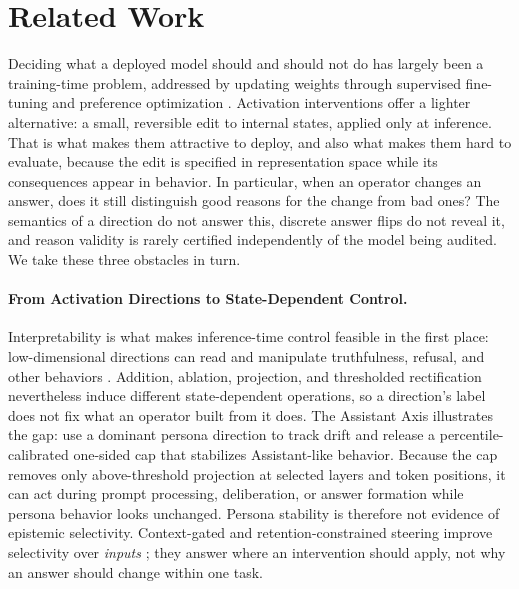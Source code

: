 \documentclass[letterpaper]{article} %
\begin{document}
\section{Related Work}
\label{sec:background}

Deciding what a deployed model should and should not do has largely been a training-time problem, addressed by updating weights through supervised fine-tuning and preference optimization \citep{ouyang2022training,rafailov2023direct}. Activation interventions offer a lighter alternative: a small, reversible edit to internal states, applied only at inference. That is what makes them attractive to deploy, and also what makes them hard to evaluate, because the edit is specified in representation space while its consequences appear in behavior. In particular, when an operator changes an answer, does it still distinguish good reasons for the change from bad ones? The semantics of a direction do not answer this, discrete answer flips do not reveal it, and reason validity is rarely certified independently of the model being audited. We take these three obstacles in turn.

\paragraph{From Activation Directions to State-Dependent Control.}

Interpretability is what makes inference-time control feasible in the first place: low-dimensional directions can read and manipulate truthfulness, refusal, and other behaviors \citep{zou2023representation,turner2023steering,li2023inference,rimsky2024steering,arditi2024refusal}. Addition, ablation, projection, and thresholded rectification nevertheless induce different state-dependent operations, so a direction's label does not fix what an operator built from it does. The Assistant Axis illustrates the gap: \citet{lu2026assistant} use a dominant persona direction to track drift and release a percentile-calibrated one-sided cap that stabilizes Assistant-like behavior. Because the cap removes only above-threshold projection at selected layers and token positions, it can act during prompt processing, deliberation, or answer formation while persona behavior looks unchanged. Persona stability is therefore not evidence of epistemic selectivity. Context-gated and retention-constrained steering improve selectivity over \emph{inputs} \citep{lee2025programming,stickland2024steering}; they answer where an intervention should apply, not why an answer should change within one task.
\end{document}
